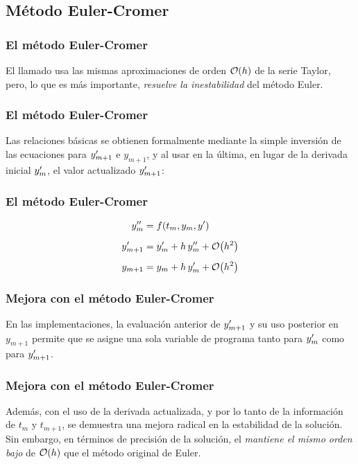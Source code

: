 \subsection{Método Euler-Cromer}
\begin{frame}
\frametitle{El método Euler-Cromer}
El llamado  usa las mismas aproximaciones de orden $\order{h}$ de la serie Taylor, pero, lo que es más importante, \emph{resuelve la inestabilidad} del método Euler.
\end{frame}
\begin{frame}
\frametitle{El método Euler-Cromer}
Las relaciones básicas se obtienen formalmente mediante la simple inversión de las ecuaciones para ${y}^{\prime}_{m + 1}$ e $y_{m + 1}$, y al usar en la última, en lugar de la derivada inicial ${y}^{\prime}_{m}$, el valor actualizado ${y}^{\prime}_{m+1}$:
\end{frame}
\begin{frame}
\frametitle{El método Euler-Cromer}
\begin{align}
\begin{aligned}
\stilde{y}_{m} &= f(t_{m}, y_{m}, \ptilde{y}) \\[0.5em]
\ptilde{y}_{m+1} &= \ptilde{y}_{m} + h \, \stilde{y}_{m} + \order{h^{2}} \\[0.5em]
y_{m+1} &= y_{m} + h \, \ptilde{y}_{m} + \order{h^{2}}
\end{aligned}
\label{eq:eq:ecuacion_12_58}
\end{align}
\end{frame}
\begin{frame}
\frametitle{Mejora con el método Euler-Cromer}
En las implementaciones, la evaluación anterior de ${y}^{\prime}_{m + 1}$ y su uso posterior en $y_{m + 1}$ permite que se asigne una sola variable de programa tanto para ${y}^{\prime}_{m}$ como para ${y}^{\prime}_{m + 1}$.
\end{frame}
\begin{frame}
\frametitle{Mejora con el método Euler-Cromer}
Además, con el uso de la derivada actualizada, y por lo tanto de la información de $t_{m}$ y $t_{m + 1}$, se demuestra una mejora radical en la estabilidad de la solución.
\\
\bigskip
\pause
Sin embargo, en términos de precisión de la solución, el  \emph{mantiene el mismo orden bajo} de $\order{h}$ que el método original de Euler.
\end{frame}
